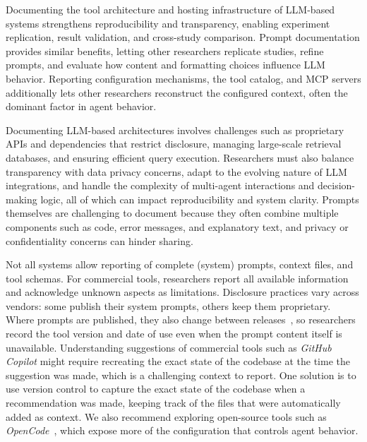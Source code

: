 
Documenting the tool architecture and hosting infrastructure of LLM-based systems strengthens reproducibility and transparency, enabling experiment replication, result validation, and cross-study comparison.
Prompt documentation provides similar benefits, letting other researchers replicate studies, refine prompts, and evaluate how content and formatting choices influence LLM behavior.
Reporting configuration mechanisms, the tool catalog, and MCP servers additionally lets other researchers reconstruct the configured context, often the dominant factor in agent behavior.


Documenting LLM-based architectures involves challenges such as proprietary APIs and dependencies that restrict disclosure, managing large-scale retrieval databases, and ensuring efficient query execution.
Researchers must also balance transparency with data privacy concerns, adapt to the evolving nature of LLM integrations, and handle the complexity of multi-agent interactions and decision-making logic, all of which can impact reproducibility and system clarity.
Prompts themselves are challenging to document because they often combine multiple components such as code, error messages, and explanatory text, and privacy or confidentiality concerns can hinder sharing.

Not all systems allow reporting of complete (system) prompts, context files, and tool schemas.
For commercial tools, researchers \must report all available information and acknowledge unknown aspects as limitations.
Disclosure practices vary across vendors: some publish their system prompts, others keep them proprietary.
Where prompts are published, they also change between releases~\cite{willison2026opus}, so researchers \should record the tool version and date of use even when the prompt content itself is unavailable.
Understanding suggestions of commercial tools such as \emph{GitHub Copilot} might require recreating the exact state of the codebase at the time the suggestion was made, which is a challenging context to report.
One solution is to use version control to capture the exact state of the codebase when a recommendation was made, keeping track of the files that were automatically added as context.
We also recommend exploring open-source tools such as \emph{OpenCode}~\cite{opencode}, which expose more of the configuration that controls agent behavior.

